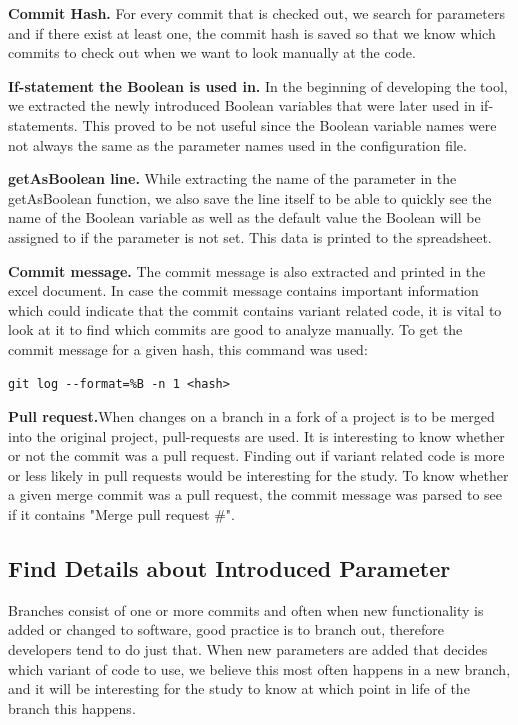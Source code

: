\textbf{Commit Hash.} For every commit that is checked out, we search for parameters and if there exist at least one, the commit hash is saved so that we know which commits to check out when we want to look manually at the code.

\textbf{If-statement the Boolean is used in.} In the beginning of developing the tool, we extracted the newly introduced Boolean variables that were later used in if-statements. This proved to be not useful since the Boolean variable names were not always the same as the parameter names used in the configuration file.

\textbf{getAsBoolean line.} While extracting the name of the parameter in the getAsBoolean function, we also save the line itself to be able to quickly see the name of the Boolean variable as well as the default value the Boolean will be assigned to if the parameter is not set. This data is printed to the spreadsheet.

\textbf{Commit message.} The commit message is also extracted and printed in the excel document. In case the commit message contains important information which could indicate that the commit contains variant related code, it is vital to look at it to find which commits are good to analyze manually.
To get the commit message for a given hash, this command was used:
\lstset{language=Bash}
\begin{lstlisting}[frame=single]
git log --format=%B -n 1 <hash>
\end{lstlisting}

\textbf{Pull request.}When changes on a branch in a fork of a project is to be merged into the original project, pull-requests are used. It is interesting to know whether or not the commit was a pull request. Finding out if variant related code is more or less likely in pull requests would be interesting for the study. To know whether a given merge commit was a pull request, the commit message was parsed to see if it contains "Merge pull request \#".
\subsection{Find Details about Introduced Parameter}
Branches consist of one or more commits and often when new functionality is added or changed to software, good practice is to branch out, therefore developers tend to do just that. When new parameters are added that decides which variant of code to use, we believe this most often happens in a new branch, and it will be interesting for the study to know at which point in life of the branch this happens.

